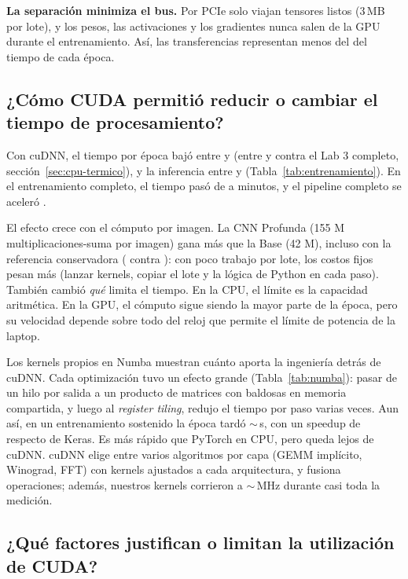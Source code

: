 \documentclass[11pt,letterpaper]{article}
\begin{document}
\textbf{La separación minimiza el bus.} Por PCIe solo viajan tensores listos (3\,MB por lote), y los pesos, las activaciones y los gradientes nunca salen de la GPU durante el entrenamiento. Así, las transferencias representan menos del \TransfMaxPct{} del tiempo de cada época.

\subsection*{¿Cómo CUDA permitió reducir o cambiar el tiempo de procesamiento?}

Con cuDNN, el tiempo por época bajó entre \SpeedupMin{} y \SpeedupMax{} (entre \SpeedupBaseLab{} y \SpeedupProfundaLab{} contra el Lab 3 completo, sección~\ref{sec:cpu-termico}), y la inferencia entre \SpeedupInfMin{} y \SpeedupInfMax{} (Tabla~\ref{tab:entrenamiento}). En el entrenamiento completo, el tiempo pasó de \CompletoMinCPU{} a \CompletoMinGPU{} minutos, y el pipeline completo se aceleró \SpeedupTotal.

El efecto crece con el cómputo por imagen. La CNN Profunda (155 M multiplicaciones-suma por imagen) gana más que la Base (42 M), incluso con la referencia conservadora (\SpeedupProfundaLab{} contra \SpeedupBaseLab): con poco trabajo por lote, los costos fijos pesan más (lanzar kernels, copiar el lote y la lógica de Python en cada paso). También cambió \emph{qué} limita el tiempo. En la CPU, el límite es la capacidad aritmética. En la GPU, el cómputo sigue siendo la mayor parte de la época, pero su velocidad depende sobre todo del reloj que permite el límite de potencia de la laptop.

Los kernels propios en Numba muestran cuánto aporta la ingeniería detrás de cuDNN. Cada optimización tuvo un efecto grande (Tabla~\ref{tab:numba}): pasar de un hilo por salida a un producto de matrices con baldosas en memoria compartida, y luego al \textit{register tiling}, redujo el tiempo por paso varias veces. Aun así, en un entrenamiento sostenido la época tardó $\sim$\NumbaEpoca\,s, con un speedup de \SpeedupNumba{} respecto de Keras. Es \NumbaVsTorchCPU{} más rápido que PyTorch en CPU, pero queda lejos de cuDNN. cuDNN elige entre varios algoritmos por capa (GEMM implícito, Winograd, FFT) con kernels ajustados a cada arquitectura, y fusiona operaciones; además, nuestros kernels corrieron a $\sim$\NumbaReloj\,MHz durante casi toda la medición.

\subsection*{¿Qué factores justifican o limitan la utilización de CUDA?}
\end{document}

